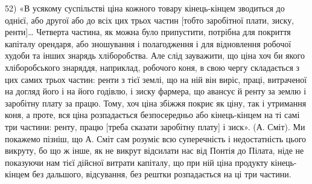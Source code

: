 52) «В усякому суспільстві ціна кожного товару кінець-кінцем зводиться до однієї, або другої або до
всіх цих трьох частин [тобто заробітної плати, зиску, ренти]… Четверта частина, як можна було
припустити, потрібна для покриття капіталу орендаря, або зношування і полагодження і для відновлення
робочої худоби та інших знарядь хліборобства. Але слід зауважити, що ціна хоч би якого
хліборобського знаряддя, наприклад, робочого коня, в свою чергу складається з цих самих трьох
частин: ренти
з тієї землі, що на ній він виріс, праці, витраченої на догляд його і на його годівлю, і зиску
фармера, що авансує й ренту за землю і заробітну плату за працю. Тому, хоч ціна збіжжя покриє як
ціну, так і утримання коня, а проте, вся ціна розпадається безпосередньо або кінець-кінцем на ті
самі три частини: ренту, працю [треба сказати заробітну плату] і зиск». (А. Сміт). Ми покажемо
пізніш, що А. Сміт сам розуміє всю суперечність і недостатність цього викруту, бо що ж інше, як не
викрут відсилати
нас від Понтія до Пілата, ніде не показуючи нам тієї дійсної витрати капіталу, що при ній ціна
продукту кінець-кінцем без дальшого, відсування, без рештки розпадається на ці три частини.
